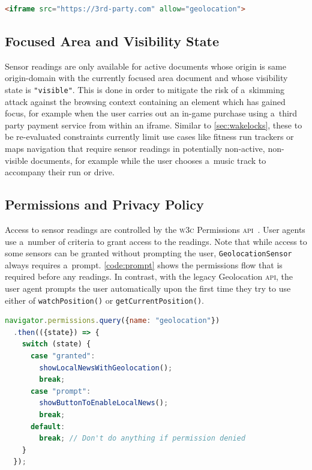 \documentclass[sigconf,hyphens]{acmart}
\begin{document}
\begin{lstlisting}[caption={Allowing an iframe to use \texttt{GeolocationSensor}},
  label=code:featurepolicy, language=HTML, float=h] 
<iframe src="https://3rd-party.com" allow="geolocation">
\end{lstlisting}

\subsection{Focused Area and Visibility State}
\label{sec:focusandvisibility}

Sensor readings are only available for active documents whose origin is same origin-domain
with the currently focused area document and whose visibility state is \texttt{"visible"}.
This is done in order to mitigate the risk of a~skimming attack
against the browsing context containing an element which has gained focus,
for example when the user carries out an in-game purchase using a~third party payment service
from within an iframe.
Similar to \autoref{sec:wakelocks}, these to be re-evaluated constraints
currently limit use cases like fitness run trackers
or maps navigation that require sensor readings in potentially non-active, non-visible documents,
for example while the user chooses a~music track to accompany their run or drive.

\subsection{Permissions and Privacy Policy}

Access to sensor readings are controlled by the \textsc{w3c} Permissions
\textsc{api}~\cite{lamouri2017permissions}.
User agents use a~number of criteria to grant access to the readings.
Note that while access to some sensors can be granted without prompting the user,
\texttt{GeolocationSensor} always requires a~prompt.
\autoref{code:prompt} shows the permissions flow that is required before any readings.
In contrast, with the legacy Geolocation \textsc{api}, the user agent prompts the user automatically
upon the first time they try to use either of \texttt{watchPosition()} or
\texttt{getCurrentPosition()}.

\begin{lstlisting}[caption={Asking for permission to use \texttt{GeolocationSensor}},
  label=code:prompt, language=JavaScript, float=h] 
navigator.permissions.query({name: "geolocation"})
  .then(({state}) => {
    switch (state) {
      case "granted":
        showLocalNewsWithGeolocation();
        break;
      case "prompt":
        showButtonToEnableLocalNews();
        break;
      default:        
        break; // Don't do anything if permission denied
    }
  });
\end{lstlisting}
\end{document}

